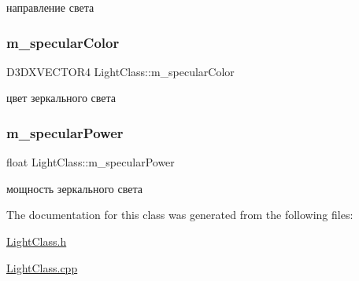 направление света 

\mbox{\label{class_light_class_a8b7cf2373ae749c29f5c083d58cc245b}} 
\subsubsection{\texorpdfstring{m\+\_\+specular\+Color}{m\_specularColor}}
{\footnotesize\ttfamily D3\+D\+X\+V\+E\+C\+T\+O\+R4 Light\+Class\+::m\+\_\+specular\+Color\hspace{0.3cm}{\ttfamily [private]}}



цвет зеркального света 

\mbox{\label{class_light_class_aaced0580b7a432b1a501f2f1cc360c08}} 
\subsubsection{\texorpdfstring{m\+\_\+specular\+Power}{m\_specularPower}}
{\footnotesize\ttfamily float Light\+Class\+::m\+\_\+specular\+Power\hspace{0.3cm}{\ttfamily [private]}}



мощность зеркального света 



The documentation for this class was generated from the following files\+:\begin{DoxyCompactItemize}
\item 
\hyperlink{_light_class_8h}{Light\+Class.\+h}\item 
\hyperlink{_light_class_8cpp}{Light\+Class.\+cpp}\end{DoxyCompactItemize}
